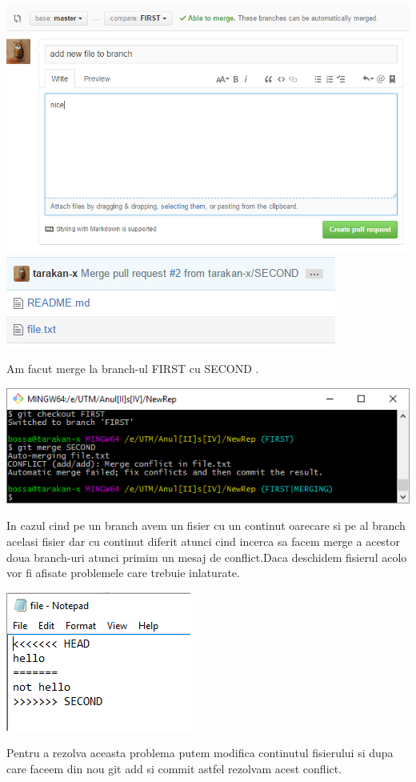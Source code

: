 \begin{center}
\includegraphics[scale=0.7]{images/compare.PNG}\\
\includegraphics[scale=0.7]{images/merge.PNG} 
\end{center}
Am facut merge la branch-ul FIRST cu SECOND .
\begin{center}
\includegraphics[scale=0.7]{images/conflict.png} 
\end{center}
In cazul cind pe un branch avem un fisier cu un continut oarecare si pe al branch acelasi fisier dar cu continut diferit atunci cind incerca sa facem merge a acestor doua branch-uri atunci primim un mesaj de conflict.Daca deschidem fisierul acolo vor fi afisate problemele care trebuie inlaturate.
\begin{center}
\includegraphics[scale=1]{images/fille.PNG} 
\end{center}
Pentru a rezolva aceasta problema putem modifica continutul fisierului si dupa care faceem din nou git add si commit astfel rezolvam acest conflict. 


\clearpage